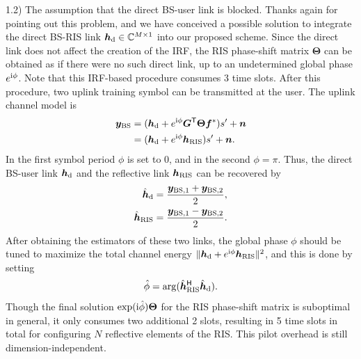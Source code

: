 \documentclass[a4paper,12pt]{article}
\def \T {^{\mathsf{T}}}
\def \H {^{\mathsf{H}}}
\def \ri {{\rm i}}
\begin{document}
{{1.2) The assumption that the direct BS-user link is blocked. Thanks again for pointing out this problem, and we have conceived a possible solution to integrate the direct BS-RIS link ${\bm h}_{\rm d}\in\mathbb{C}^{M\times 1}$ into our proposed scheme. Since the direct link does not affect the creation of the IRF, the RIS phase-shift matrix $\bm \Theta$ can be obtained as if there were no such direct link, up to an undetermined global phase $e^{\ri \phi}$. Note that this IRF-based procedure consumes 3 time slots. After this procedure, two uplink training symbol can be transmitted at the user. The uplink channel model is 
\begin{equation}
    \begin{aligned}
        {\bm y}_{\rm BS} &= ({\bm h}_{\rm d} + e^{\ri \phi}{\bm G}\T {\bm \Theta} {\bm f}^*) s' + {\bm n} \\
        &= ({\bm h}_{\rm d} + e^{\ri \phi}{\bm h}_{\rm RIS})s' + {\bm n}.
    \end{aligned}  
\end{equation}
In the first symbol period $\phi$ is set to 0, and in the second $\phi=\pi$. Thus, the direct BS-user link ${\bm h}_{\rm d}$ and the reflective link ${\bm h}_{\rm RIS}$ can be recovered by 
\begin{equation}
    \begin{aligned}
        \hat{\bm h}_{\rm d} &= \frac{{\bm y}_{{\rm BS}, 1} + {\bm y}_{{\rm BS}, 2}}{2},\\
        \hat{\bm h}_{\rm RIS} &= \frac{{\bm y}_{{\rm BS}, 1} - {\bm y}_{{\rm BS}, 2}}{2}. 
    \end{aligned}
\end{equation}
After obtaining the estimators of these two links, the global phase $\phi$ should be tuned to maximize the total channel energy $\| {\bm h}_{\rm d} + e^{\ri \phi}{\bm h}_{\rm RIS} \|^2$, and this is done by setting 
\begin{equation}
    \hat{\phi} = \arg(\hat{\bm h}_{\rm RIS}\H \hat{\bm h}_{\rm d}).
\end{equation}
Though the final solution $\exp(\ri \hat{\phi}) {\bm \Theta}$ for the RIS phase-shift matrix is suboptimal in general, it only consumes two additional 2 slots, resulting in 5 time slots in total for configuring $N$ reflective elements of the RIS. This pilot overhead is still dimension-independent. 

}}
\end{document}
